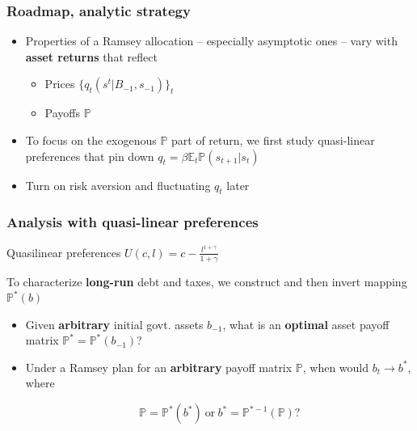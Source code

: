 \documentclass{beamer}
\begin{document}
\begin{frame}
\frametitle{Roadmap, analytic strategy}

	\begin{itemize}
	\item Properties of a Ramsey allocation -- especially asymptotic ones --   vary with   \textbf{asset returns} that reflect
	\begin{itemize}
	 \item Prices $\{q_t(s^t|B_{-1},s_{-1})\}_t$
	 \item Payoffs $\mathbb{P}$
	\end{itemize}
	
\item To focus on the exogenous $\mathbb{P}$ part of return, we first study quasi-linear  preferences  that pin down $q_t=\beta \mathbb{E}_t
\mathbb{P}(s_{t+1}|s_t)$

\item Turn on  risk aversion and fluctuating $q_t$ later
	
\end{itemize}
\end{frame}


\begin{frame}
\frametitle{Analysis with quasi-linear preferences}


Quasilinear preferences $U(c,l)=c-\frac{l^{1+\gamma}}{1+\gamma}$

 To characterize \textbf{long-run}  debt and  taxes,  we construct and then invert  mapping $\mathbb{P}^*(b)$

\begin{itemize}
 \item Given \textbf{arbitrary} initial govt. assets $b_{-1}$, what is  an \textbf{optimal} asset payoff matrix $\mathbb{P}^* =\mathbb{P}^*(b_{-1})$?

 \item Under a Ramsey plan for an \textbf{arbitrary} payoff matrix $\mathbb{P}$,  when would  $b_t \to b^*$, where

	\[\mathbb{P}=\mathbb{P}^*(b^*) \ \textrm{or} \ b^* = \mathbb{P}^{* -1}(\mathbb{P}) ?\]
	
\end{itemize}
\end{frame}
\end{document}
